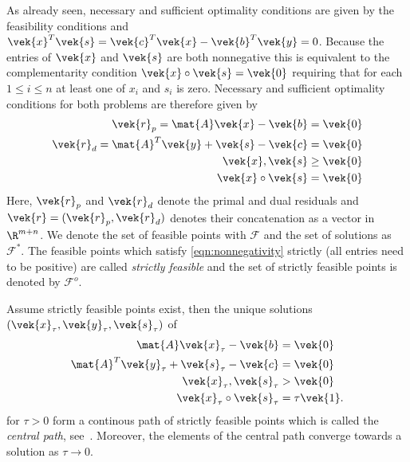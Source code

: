 As already seen, necessary and sufficient optimality conditions are given by the feasibility conditions and \(\vek{x}^T \vek{s} = \vek{c}^T \vek{x} - \vek{b}^T \vek{y} = 0\).
Because the entries of \(\vek{x}\) and \(\vek{s}\) are both nonnegative this is equivalent to the complementarity condition \(\vek{x} \circ \vek{s} = \vek{0}\) requiring that for each \(1 \leq i \leq n\) at least one of \(x_i\) and \(s_i\) is zero.
Necessary and sufficient optimality conditions for both problems are therefore given by
\begin{subequations}\label{eqn:optimality-conditions}
  \begin{align}
    \label{eqn:primal-feasibility}
    \vek{r}_p = \mat{A}\vek{x} - \vek{b} &= \vek{0} \\
    \label{eqn:dual-feasibility}
    \vek{r}_d = \mat{A}^T \vek{y} + \vek{s} - \vek{c} &= \vek{0} \\
    \label{eqn:nonnegativity}
    \vek{x}, \vek{s} &\geq \vek{0} \\
    \label{eqn:complementarity}
    \vek{x} \circ \vek{s} &= \vek{0}
  \end{align}
\end{subequations}
Here, \(\vek{r}_p\) and \(\vek{r}_d\) denote the primal and dual residuals and \(\vek{r} = (\vek{r}_p, \vek{r}_d)\) denotes their concatenation as a vector in \(\R^{m+n}\).
We denote the set of feasible points with \(\mathcal{F}\) and the set of solutions as \(\mathcal{F}^*\).
The feasible points which satisfy \cref{eqn:nonnegativity} strictly (all entries need to be positive) are called \emph{strictly feasible} and the set of strictly feasible points is denoted by \(\mathcal{F}^o\).

Assume strictly feasible points exist, then the unique solutions \((\vek{x}_\tau, \vek{y}_\tau, \vek{s}_\tau)\) of
\begin{subequations}
  \begin{align}
    \mat{A}\vek{x}_\tau - \vek{b} &= \vek{0} \\
    \mat{A}^T \vek{y}_\tau + \vek{s}_\tau - \vek{c} &= \vek{0} \\
    \vek{x}_\tau, \vek{s}_\tau &> \vek{0} \label{eqn:strict-nonnegativity} \\
    \vek{x}_\tau \circ \vek{s}_\tau &= \tau \vek{1}.
  \end{align}
\end{subequations}
for \(\tau > 0\) form a continous path of strictly feasible points which is called the \emph{central path}, see~\cite[Theorem 2.8]{Wright-PrimalDualInteriorPointMethods}.
Moreover, the elements of the central path converge towards a solution as \(\tau \to 0\).

